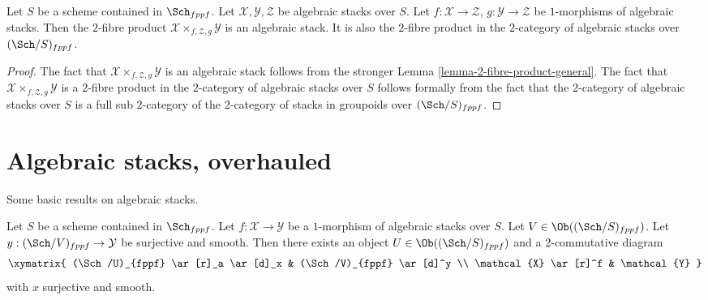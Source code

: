 \begin{lemma}
\label{lemma-2-fibre-product}
Let $S$ be a scheme contained in $\Sch_{fppf}$.
Let $\mathcal{X}, \mathcal{Y}, \mathcal{Z}$ be algebraic stacks over $S$.
Let $f : \mathcal{X} \to \mathcal{Z}$, $g : \mathcal{Y} \to \mathcal{Z}$
be $1$-morphisms of algebraic stacks. Then the $2$-fibre product
$\mathcal{X} \times_{f, \mathcal{Z}, g} \mathcal{Y}$ is an algebraic stack.
It is also the $2$-fibre product in the $2$-category of algebraic stacks
over $(\Sch/S)_{fppf}$.
\end{lemma}

\begin{proof}
The fact that $\mathcal{X} \times_{f, \mathcal{Z}, g} \mathcal{Y}$ is an
algebraic stack follows from the stronger
Lemma \ref{lemma-2-fibre-product-general}.
The fact that $\mathcal{X} \times_{f, \mathcal{Z}, g} \mathcal{Y}$
is a $2$-fibre product in the $2$-category of algebraic stacks over $S$
follows formally from the fact that the $2$-category of algebraic stacks
over $S$ is a full sub $2$-category of the $2$-category of stacks in
groupoids over $(\Sch/S)_{fppf}$.
\end{proof}







\section{Algebraic stacks, overhauled}
\label{section-overhaul}

\noindent
Some basic results on algebraic stacks.

\begin{lemma}
\label{lemma-lift-morphism-presentations}
Let $S$ be a scheme contained in $\Sch_{fppf}$.
Let $f : \mathcal{X} \to \mathcal{Y}$ be a $1$-morphism of algebraic
stacks over $S$.
Let $V \in \Ob((\Sch/S)_{fppf})$.
Let $y : (\Sch/V)_{fppf} \to \mathcal{Y}$ be surjective and smooth.
Then there exists an object $U \in \Ob((\Sch/S)_{fppf})$
and a $2$-commutative diagram
$$
\xymatrix{
(\Sch/U)_{fppf} \ar[r]_a \ar[d]_x &
(\Sch/V)_{fppf} \ar[d]^y \\
\mathcal{X} \ar[r]^f & \mathcal{Y}
}
$$
with $x$ surjective and smooth.
\end{lemma}

